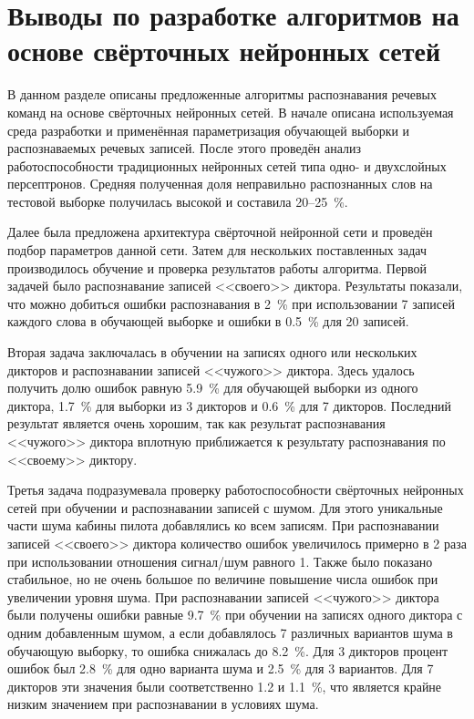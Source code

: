 \section{Выводы по разработке алгоритмов на основе свёрточных нейронных сетей} \label{sect4_7}

В данном разделе описаны предложенные алгоритмы распознавания речевых команд на основе свёрточных нейронных сетей.
В начале описана используемая среда разработки и применённая параметризация обучающей выборки и распознаваемых речевых записей.
После этого проведён анализ работоспособности традиционных нейронных сетей типа одно- и двухслойных персептронов.
Средняя полученная доля неправильно распознанных слов на тестовой выборке получилась высокой и составила 20--25~\%.

Далее была предложена архитектура свёрточной нейронной сети и проведён подбор параметров данной сети.
Затем для нескольких поставленных задач производилось обучение и проверка результатов работы алгоритма.
Первой задачей было распознавание записей <<своего>> диктора.
Результаты показали, что можно добиться ошибки распознавания в 2~\% при использовании 7 записей каждого слова в обучающей выборке и ошибки в 0.5~\% для 20 записей.

Вторая задача заключалась в обучении на записях одного или нескольких дикторов и распознавании записей <<чужого>> диктора.
Здесь удалось получить долю ошибок равную 5.9~\% для обучающей выборки из одного диктора, 1.7~\% для выборки из 3 дикторов и 0.6~\% для 7 дикторов.
Последний результат является очень хорошим, так как результат распознавания <<чужого>> диктора вплотную приближается к результату распознавания по <<своему>> диктору.

Третья задача подразумевала проверку работоспособности свёрточных нейронных сетей при обучении и распознавании записей с шумом.
Для этого уникальные части шума кабины пилота добавлялись ко всем записям.
При распознавании записей <<своего>> диктора количество ошибок увеличилось примерно в 2 раза при использовании отношения сигнал/шум равного 1.
Также было показано стабильное, но не очень большое по величине повышение числа ошибок при увеличении уровня шума.
При распознавании записей <<чужого>> диктора были получены ошибки равные 9.7~\% при обучении на записях одного диктора с одним добавленным шумом, а если добавлялось 7 различных вариантов шума в обучающую выборку, то ошибка снижалась до 8.2~\%.
Для 3 дикторов процент ошибок был 2.8~\% для одно варианта шума и 2.5~\% для 3 вариантов.
Для 7 дикторов эти значения были соответственно 1.2 и 1.1~\%, что является крайне низким значением при распознавании в условиях шума.

